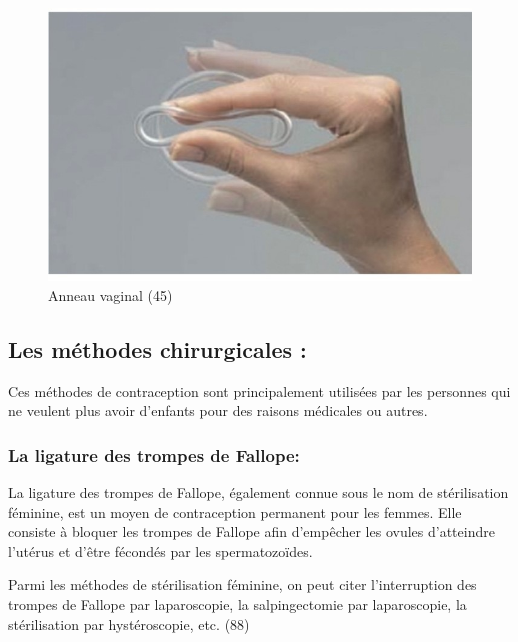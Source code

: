 \begin{figure}[H]
  \centering
  \includegraphics[scale=1.1]{Images/fig_42.jpg}
  \caption{Anneau vaginal (45)}
  
\end{figure}

\subsection{Les méthodes chirurgicales : }

Ces méthodes de contraception sont principalement utilisées par les personnes qui ne veulent plus avoir d’enfants pour des raisons médicales ou autres.

\subsubsection{La ligature des trompes de Fallope: }

La ligature des trompes de Fallope, également connue sous le nom de stérilisation féminine, est un moyen de contraception permanent pour les femmes. Elle consiste à bloquer les trompes de Fallope afin d’empêcher les ovules d’atteindre l’utérus et d’être fécondés par les spermatozoïdes. \vspace{1em}

\noindent Parmi les méthodes de stérilisation féminine, on peut citer l’interruption des trompes de Fallope par laparoscopie, la salpingectomie par laparoscopie, la stérilisation par hystéroscopie, etc. (88)

